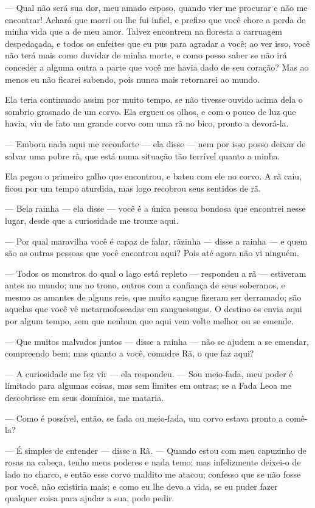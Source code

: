 — Qual não será sua dor, meu amado esposo, quando vier me procurar e
não me encontrar! Achará que morri ou lhe fui infiel, e prefiro que
você chore a perda de minha vida que a de meu amor. Talvez encontrem
na floresta a carruagem despedaçada, e todos os enfeites que eu pus
para agradar a você; ao ver isso, você não terá mais como duvidar de
minha morte, e como posso saber se não irá conceder a alguma outra a
parte que você me havia dado de seu coração? Mas ao menos eu não
ficarei sabendo, pois nunca mais retornarei ao mundo.

Ela teria continuado assim por muito tempo, se não tivesse ouvido
acima dela o sombrio grasnado de um corvo. Ela ergueu os olhos, e com
o pouco de luz que havia, viu de fato um grande corvo com uma rã no
bico, pronto a devorá-la. 

— Embora nada aqui me reconforte — ela disse — nem por isso posso
deixar de salvar uma pobre rã, que está numa situação tão terrível
quanto a minha. 

Ela pegou o primeiro galho que encontrou, e bateu com ele no corvo. A
rã caiu, ficou por um tempo aturdida, mas logo recobrou seus sentidos
de rã.

— Bela rainha — ela disse — você é a única pessoa bondosa que
encontrei nesse lugar, desde que a curiosidade me trouxe aqui. 

— Por qual maravilha você é capaz de falar, rãzinha — disse a rainha —
e quem são as outras pessoas que você encontrou aqui? Pois até agora
não vi ninguém.

— Todos os monstros do qual o lago está repleto — respondeu a rã —
estiveram antes no mundo; uns no trono, outros com a confiança de
seus soberanos, e mesmo as amantes de alguns reis, que muito sangue
fizeram ser derramado; são aquelas que você vê metarmofoseadas em
sanguessugas. O destino os envia aqui por algum tempo, sem que nenhum
que aqui vem volte melhor ou se emende. 

— Que muitos malvados juntos — disse a rainha — não se ajudem a se
emendar, compreendo bem; mas quanto a você, comadre Rã, o que faz
aqui?

— A curiosidade me fez vir — ela respondeu. — Sou meio-fada, meu poder
é limitado para algumas coisas, mas sem limites em outras; se a Fada
Leoa me descobrisse em seus domínios, me mataria. 

— Como é possível, então, se fada ou meio-fada, um corvo estava pronto
a comê-la? 

— É simples de entender — disse a Rã. — Quando estou com meu capuzinho
de rosas na cabeça, tenho meus poderes e nada temo; mas infelizmente
deixei-o de lado no charco, e então esse corvo maldito me atacou;
confesso que se não fosse por você, não existiria mais; e como eu lhe
devo a vida, se eu puder fazer qualquer coisa para ajudar a sua, pode
pedir.

